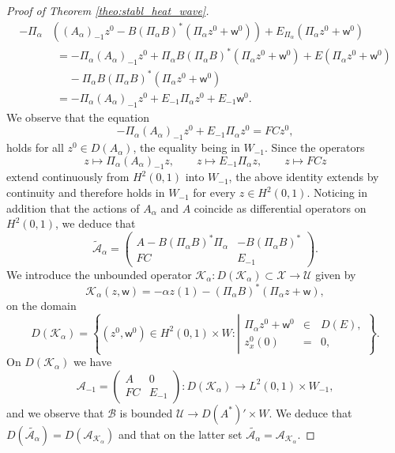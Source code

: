 \documentclass[10pt]{article}
\begin{document}
\begin{proof}[Proof of Theorem \ref{theo:stabl_heat_wave}]
\begin{align*}
-\Pi_\alpha &\left( (A_\alpha)_{-1} z^0 - B(\Pi_\alpha B)^* (\Pi_\alpha z^0 + \mathsf{w}^0) \right) + E_{\Pi_\alpha} (\Pi_\alpha z^0 + \mathsf{w}^0) \\
&~~= -\Pi_\alpha (A_\alpha)_{-1}z^0 + \Pi_\alpha B (\Pi_\alpha B)^*(\Pi_\alpha z^0 + \mathsf{w}^0) + E(\Pi_\alpha z^0 + \mathsf{w}^0) \\
&~~~~~~~- \Pi_\alpha B (\Pi_\alpha B)^*(\Pi_\alpha z^0 + \mathsf{w}^0) \\
&~~= -\Pi_\alpha (A_\alpha)_{-1}z^0+ E_{-1} \Pi_\alpha z^0 + E_{-1} \mathsf{w}^0.
\end{align*}
We observe that the equation 
\[
-\Pi_\alpha (A_\alpha)_{-1}z^0+ E_{-1} \Pi_\alpha z^0 = FCz^0,
\]
holds for all $z^0 \in D(A_\alpha)$, the equality being in $W_{-1}$. 
Since the operators
\[
z \mapsto \Pi_\alpha (A_\alpha)_{-1}z,
\qquad
z \mapsto E_{-1}\Pi_\alpha z,
\qquad
z \mapsto FCz
\]
extend continuously from $H^2(0,1)$ into $W_{-1}$, the above identity extends by continuity and therefore holds in $W_{-1}$ for every $z\in H^2(0,1)$.
 Noticing in addition that the actions of $A_\alpha$ and $A$ coincide as differential operators on $H^2(0,1)$, we deduce that
\[
\tilde{\mathcal{A}}_\alpha = \left( \begin{array}{cc}
A - B (\Pi_\alpha B)^* \Pi_\alpha & -B(\Pi_\alpha B)^* \\
FC & E_{-1}
\end{array} \right).
\]
We introduce the unbounded operator $\mathcal{K}_\alpha : D(\mathcal{K}_\alpha) \subset \mathcal{X} \to \mathcal{U}$ given by 
\[
\mathcal{K}_\alpha(z,\mathsf{w}) = - \alpha z(1) -(\Pi_\alpha B)^*(\Pi_\alpha z + \mathsf{w}),
\]
on the domain
\[
D(\mathcal{K}_\alpha) = \left\lbrace (z^0,\mathsf{w}^0) \in H^2(0,1) \times W : \left| \begin{array}{rcl}
\Pi_\alpha z^0 + \mathsf{w}^0 &\in& D(E), \\
z_x^0(0) &=& 0, 
\end{array}\right. \right\rbrace.
\]
On $D(\mathcal{K}_\alpha)$ we have 
\[
\mathcal{A}_{-1} = \left( \begin{array}{cc}
A  & 0 \\
FC & E_{-1}
\end{array} \right) : D(\mathcal{K}_\alpha) \to L^2(0,1) \times W_{-1},
\]
and we observe that $\mathcal{B}$ is bounded $\mathcal{U} \to D(A^*)' \times W$. We deduce that $D(\tilde{\mathcal{A}_\alpha}) = D(\mathcal{A}_{\mathcal{K}_\alpha})$ and that on the latter set $\tilde{\mathcal{A}_\alpha} = \mathcal{A}_{\mathcal{K}_\alpha}$.
\end{proof}
\end{document}
